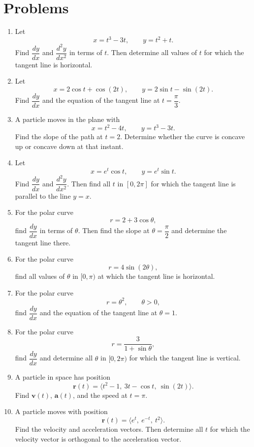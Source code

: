 \documentclass[12pt]{article}
\begin{document}
\section*{Problems}
\begin{enumerate}[leftmargin=*, itemsep=1em, topsep=0.8em]
  \item Let
  \[
  x=t^3-3t,\qquad y=t^2+t.
  \]
  Find $\dfrac{dy}{dx}$ and $\dfrac{d^2y}{dx^2}$ in terms of $t$. Then determine all values of $t$ for which the tangent line is horizontal.

  \item Let
  \[
  x=2\cos t+\cos(2t),\qquad y=2\sin t-\sin(2t).
  \]
  Find $\dfrac{dy}{dx}$ and the equation of the tangent line at $t=\dfrac{\pi}{3}$.

  \item A particle moves in the plane with
  \[
  x=t^2-4t,\qquad y=t^3-3t.
  \]
  Find the slope of the path at $t=2$. Determine whether the curve is concave up or concave down at that instant.

  \item Let
  \[
  x=e^t\cos t,\qquad y=e^t\sin t.
  \]
  Find $\dfrac{dy}{dx}$ and $\dfrac{d^2y}{dx^2}$. Then find all $t$ in $[0,2\pi]$ for which the tangent line is parallel to the line $y=x$.

  \item For the polar curve
  \[
  r=2+3\cos\theta,
  \]
  find $\dfrac{dy}{dx}$ in terms of $\theta$. Then find the slope at $\theta=\dfrac{\pi}{2}$ and determine the tangent line there.

  \item For the polar curve
  \[
  r=4\sin(2\theta),
  \]
  find all values of $\theta$ in $[0,\pi)$ at which the tangent line is horizontal.

  \item For the polar curve
  \[
  r=\theta^2,\qquad \theta>0,
  \]
  find $\dfrac{dy}{dx}$ and the equation of the tangent line at $\theta=1$.

  \item For the polar curve
  \[
  r=\frac{3}{1+\sin\theta},
  \]
  find $\dfrac{dy}{dx}$ and determine all $\theta$ in $[0,2\pi)$ for which the tangent line is vertical.

  \item A particle in space has position
  \[
  \mathbf{r}(t)=\langle t^2-1,\ 3t-\cos t,\ \sin(2t)\rangle.
  \]
  Find $\mathbf{v}(t)$, $\mathbf{a}(t)$, and the speed at $t=\pi$.

  \item A particle moves with position
  \[
  \mathbf{r}(t)=\langle e^t,\ e^{-t},\ t^2\rangle.
  \]
  Find the velocity and acceleration vectors. Then determine all $t$ for which the velocity vector is orthogonal to the acceleration vector.


\end{enumerate}
\end{document}
